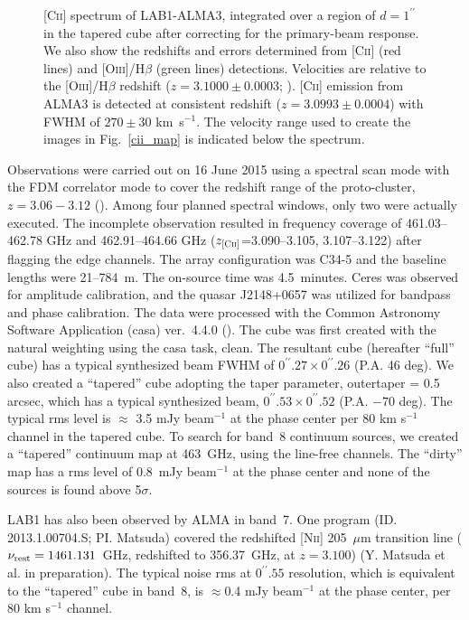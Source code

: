 \documentclass[apj]{emulateapj}
\begin{document}
\begin{figure}
\caption{
[\textsc{Cii}] spectrum of LAB1-ALMA3, integrated over a region of $d=1^{\prime\prime}$ in the tapered cube after correcting for the primary-beam response.
We also show the redshifts and errors determined from [\textsc{Cii}] (red lines) and [\textsc{Oiii}]/H$\beta$ (green lines) detections.
Velocities are relative to the [\textsc{Oiii}]/H$\beta$ redshift ($z=3.1000\pm0.0003$; \citealt{2015ApJ...799...38K}).
[\textsc{Cii}] emission from ALMA3 is detected at consistent redshift ($z=3.0993\pm0.0004$) with FWHM of $270\pm30$ km~s$^{-1}$.
The velocity range used to create the images in Fig.~\ref{cii_map} is indicated below the spectrum.
}
\label{spectra}
\end{figure}


Observations were carried out on 16 June 2015 using a spectral scan mode with the FDM correlator mode to cover the redshift range of the proto-cluster, $z=3.06-3.12$ (\citealt{2005ApJ...634L.125M}).
Among four planned spectral windows, only two were actually executed.
The incomplete observation resulted in frequency coverage of 461.03--462.78 GHz and 462.91--464.66 GHz ($z_\textsc{[Cii]}$=3.090--3.105, 3.107--3.122) after flagging the edge channels.
The array configuration was C34-5 and the baseline lengths were 21--784~m.
The on-source time was 4.5~minutes.
Ceres was observed for amplitude calibration, and 
the quasar J2148+0657 was utilized for bandpass and phase calibration.
The data were processed with the Common Astronomy Software Application ({\sc casa}) ver.~4.4.0 (\citealt{2007ASPC..376..127M}).
The cube was first created with the natural weighting using the {\sc casa} task, {\sc clean}.
The resultant cube (hereafter ``full'' cube) has a typical synthesized beam FWHM of $0^{\prime\prime}.27\times0^{\prime\prime}.26$ (P.A. 46 deg).
We also created a ``tapered'' cube adopting the taper parameter, outertaper = 0.5 arcsec, which has a typical synthesized beam, $0^{\prime\prime}.53\times0^{\prime\prime}.52$ (P.A. $-70$ deg).
The typical rms level is $\approx$ 3.5 mJy beam$^{-1}$ at the phase center per 80 km s$^{-1}$ channel in the tapered cube. 
To search for band~8 continuum sources, we created a ``tapered'' continuum map at 463~GHz, using the line-free channels.
The ``dirty'' map has a rms level of 0.8~mJy beam$^{-1}$ at the phase center and none of the sources is found above 5$\sigma$. 

LAB1 has also been observed by ALMA in band~7.
One program (ID. 2013.1.00704.S; PI. Matsuda) covered the redshifted \textsc{[Nii]} 205~$\mu$m transition line ($\nu_{\rm rest}=1461.131$~GHz, redshifted to 356.37~GHz, at $z=3.100$) (Y. Matsuda et al. in preparation). 
The typical noise rms at $0^{\prime\prime}.55$ resolution, which is equivalent to the ``tapered'' cube in band~8, is $\approx$0.4 mJy beam$^{-1}$ at the phase center, per 80 km s$^{-1}$ channel. 
\end{document}
